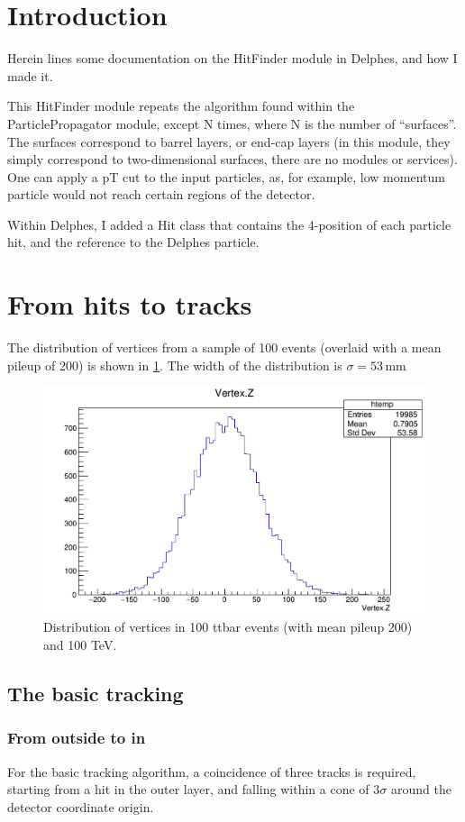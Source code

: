 \documentclass[a4paper, 12pt]{article}
\begin{document}
\section{Introduction}
Herein lines some documentation on the HitFinder module in Delphes, and how I made it. 

This HitFinder module repeats the algorithm found within the ParticlePropagator module, except N times, where N is the number of ``surfaces''. 
The surfaces correspond to barrel layers, or end-cap layers (in this module, they simply correspond to two-dimensional surfaces, there are no modules or services). 
One can apply a pT cut to the input particles, as, for example, low momentum particle would not reach certain regions of the detector. 

Within Delphes, I added a Hit class that contains the 4-position of each particle hit, and the reference to the Delphes particle. 

\section{From hits to tracks}
The distribution of vertices from a sample of 100 events (overlaid with a mean pileup of 200) is shown in \ref{fig:vertices}.
The width of the distribution is $\sigma = 53$\,mm 
\begin{figure}
  \centering
  \includegraphics[width=0.5\linewidth]{images/vertexDistribution}
  \caption{Distribution of vertices in 100 ttbar events (with mean pileup 200) and 100 TeV.}
  \label{fig:vertices}
\end{figure}

\subsection{The basic tracking}
\subsubsection{From outside to in}
For the basic tracking algorithm, a coincidence of three tracks is required, starting from a hit in the outer layer, and falling within a cone of $3\sigma$ around the detector coordinate origin. 
\end{document}
